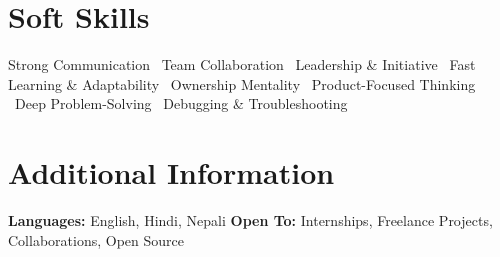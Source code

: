 \documentclass[a4paper,10pt]{article}
\begin{document}
\section*{Soft Skills}
Strong Communication \textbullet\ Team Collaboration \textbullet\ Leadership \& Initiative \textbullet\ Fast Learning \& Adaptability \textbullet\ Ownership Mentality \textbullet\ Product-Focused Thinking \textbullet\ Deep Problem-Solving \textbullet\ Debugging \& Troubleshooting

\section*{Additional Information}
\textbf{Languages:} English, Hindi, Nepali \hfill \textbf{Open To:} Internships, Freelance Projects, Collaborations, Open Source
\end{document}
